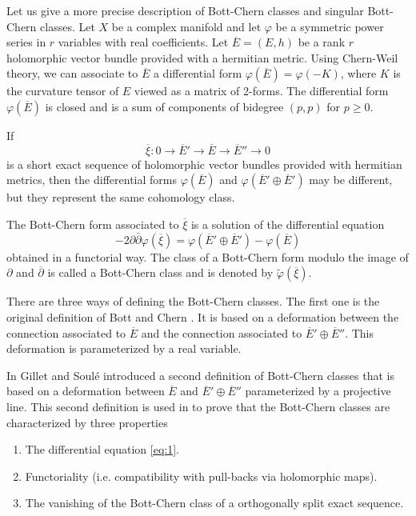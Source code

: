 \documentclass[10pt,twoside]{article}
\numberwithin{equation}{section}
\theoremstyle{plain}
\theoremstyle{definition}
\begin{document}
Let us give a more precise description of Bott-Chern
classes and singular Bott-Chern
classes.
Let $X$ be a complex manifold and let $\varphi$ be a symmetric power
series in $r$ variables with real coefficients. Let $\overline
E=(E,h)$ be a rank $r$ holomorphic vector bundle provided with a
hermitian 
metric. Using Chern-Weil theory, we can associate to $\overline E$ a
differential form $\varphi(\overline E)=\varphi(-K)$, where $K$ is the
curvature tensor of $E$ viewed as a matrix of 2-forms. The
differential form $\varphi(\overline E)$ is closed and is a sum of
components of bidegree $(p,p)$ for $p\ge 0$.

If
$$\overline {\xi}\colon 0\longrightarrow \overline{E}'\longrightarrow
\overline{E}\longrightarrow 
\overline{E}''\longrightarrow 0$$ 
is a short exact sequence of holomorphic vector bundles provided with
hermitian metrics, then the differential forms $\varphi(\overline E)$
and $\varphi(\overline {E}'\oplus \overline {E}')$ may be different,
but they represent the same cohomology class. 

The Bott-Chern form associated to $\overline \xi$ is a solution of the
differential equation         
\begin{equation}\label{eq:1}
  -2\partial\bar \partial \varphi(\overline \xi)=
\varphi(\overline {E}'\oplus \overline {E}')
- \varphi(\overline E)
\end{equation}
obtained in a functorial way. The class of a Bott-Chern form modulo
the image of $\partial$ and $\overline{\partial}$ is called a
Bott-Chern class and is denoted by $\widetilde
{\varphi}(\overline {\xi})$.

There are three ways of defining the Bott-Chern classes. The
first one is the original definition of Bott and Chern
\cite{BottChern:hvb}. It is based on a deformation
between the connection associated to $\overline E$ and the connection
associated to $\overline E'\oplus \overline E''$. This deformation is
parameterized by a real variable. 

In \cite{GilletSoule:MR854556} Gillet and
Soul\'e introduced a second definition of Bott-Chern classes that
is 
based on a deformation between $\overline E$ and $\overline E'\oplus
\overline E''$ parameterized by a projective line. This second
definition is used in \cite{BismutGilletSoule:at} to prove that the
Bott-Chern classes are characterized by three properties
\begin{enumerate}
\item \label{item:1} The differential equation \eqref{eq:1}.
\item \label{item:2} Functoriality (i.e. compatibility with pull-backs
  via holomorphic maps). 
\item \label{item:3} The vanishing of the Bott-Chern class of a
  orthogonally split
  exact sequence. 
\end{enumerate}
\end{document}
